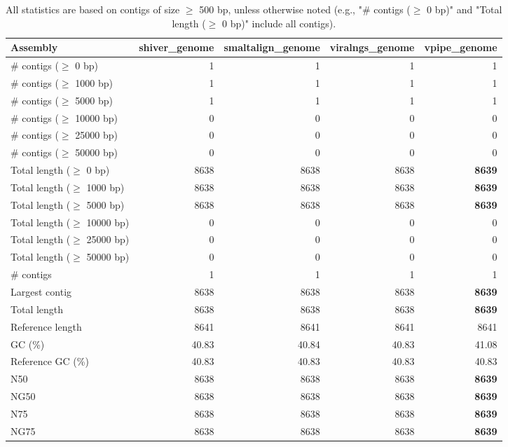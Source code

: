 \documentclass[12pt,a4paper]{article}
\begin{document}
\begin{table}[ht]
\begin{center}
\caption{All statistics are based on contigs of size $\geq$ 500 bp, unless otherwise noted (e.g., "\# contigs ($\geq$ 0 bp)" and "Total length ($\geq$ 0 bp)" include all contigs).}
\begin{tabular}{|l*{4}{|r}|}
\hline
Assembly & shiver\_genome & smaltalign\_genome & viralngs\_genome & vpipe\_genome \\ \hline
\# contigs ($\geq$ 0 bp) & 1 & 1 & 1 & 1 \\ \hline
\# contigs ($\geq$ 1000 bp) & 1 & 1 & 1 & 1 \\ \hline
\# contigs ($\geq$ 5000 bp) & 1 & 1 & 1 & 1 \\ \hline
\# contigs ($\geq$ 10000 bp) & 0 & 0 & 0 & 0 \\ \hline
\# contigs ($\geq$ 25000 bp) & 0 & 0 & 0 & 0 \\ \hline
\# contigs ($\geq$ 50000 bp) & 0 & 0 & 0 & 0 \\ \hline
Total length ($\geq$ 0 bp) & 8638 & 8638 & 8638 & {\bf 8639} \\ \hline
Total length ($\geq$ 1000 bp) & 8638 & 8638 & 8638 & {\bf 8639} \\ \hline
Total length ($\geq$ 5000 bp) & 8638 & 8638 & 8638 & {\bf 8639} \\ \hline
Total length ($\geq$ 10000 bp) & 0 & 0 & 0 & 0 \\ \hline
Total length ($\geq$ 25000 bp) & 0 & 0 & 0 & 0 \\ \hline
Total length ($\geq$ 50000 bp) & 0 & 0 & 0 & 0 \\ \hline
\# contigs & 1 & 1 & 1 & 1 \\ \hline
Largest contig & 8638 & 8638 & 8638 & {\bf 8639} \\ \hline
Total length & 8638 & 8638 & 8638 & {\bf 8639} \\ \hline
Reference length & 8641 & 8641 & 8641 & 8641 \\ \hline
GC (\%) & 40.83 & 40.84 & 40.83 & 41.08 \\ \hline
Reference GC (\%) & 40.83 & 40.83 & 40.83 & 40.83 \\ \hline
N50 & 8638 & 8638 & 8638 & {\bf 8639} \\ \hline
NG50 & 8638 & 8638 & 8638 & {\bf 8639} \\ \hline
N75 & 8638 & 8638 & 8638 & {\bf 8639} \\ \hline
NG75 & 8638 & 8638 & 8638 & {\bf 8639} \\ \hline

\end{tabular}
\end{center}
\end{table}
\end{document}
